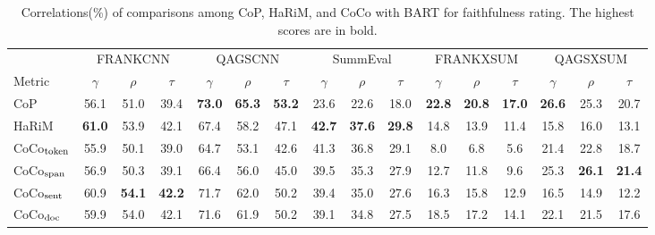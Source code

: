 \begin{table}[t]
	\scriptsize
	\centering
	\begin{tabular}{l|ccc|ccc|ccc|ccc|ccc}
		\toprule[1pt]
		&  \multicolumn{3}{c}{FRANKCNN} & \multicolumn{3}{c}{QAGSCNN} & \multicolumn{3}{c}{SummEval} & \multicolumn{3}{c}{FRANKXSUM} & \multicolumn{3}{c}{QAGSXSUM} \\
		Metric & $\gamma$ &$\rho$ & $\tau$ & $\gamma$ &$\rho$ & $\tau$ & $\gamma$ &$\rho$ & $\tau$ & $\gamma$ &$\rho$ & $\tau$ & $\gamma$ &$\rho$ & $\tau$ \\
		\hline
		CoP & 56.1 & 51.0 & 39.4 & \textbf{73.0} & \textbf{65.3} & \textbf{53.2} & 23.6 & 22.6 & 18.0 & \textbf{22.8} & \textbf{20.8} & \textbf{17.0} & \textbf{26.6} & 25.3 & 20.7 \\
		HaRiM & \textbf{61.0} & 53.9 & 42.1 & 67.4 & 58.2 & 47.1 & \textbf{42.7} & \textbf{37.6} & \textbf{29.8} & 14.8 & 13.9 & 11.4 & 15.8 & 16.0 & 13.1 \\ 
		CoCo$_{\rm token}$ & 55.9 & 50.1 & 39.0 & 64.7 & 53.1 & 42.6 & 41.3 & 36.8 & 29.1 & 8.0 & 6.8 & 5.6 & 21.4 & 22.8 & 18.7 \\
		CoCo$_{\rm span}$ & 56.9 & 50.3 & 39.1 & 66.4 & 56.0 & 45.0 & 39.5 & 35.3 & 27.9 & 12.7 & 11.8 & 9.6 & 25.3 & \textbf{26.1} & \textbf{21.4} \\
		CoCo$_{\rm sent}$ & 60.9 & \textbf{54.1} & \textbf{42.2} & 71.7 & 62.0 & 50.2 & 39.4 & 35.0 & 27.6 & 16.3 & 15.8 & 12.9 & 16.5 & 14.9 & 12.2\\
		CoCo$_{\rm doc}$ & 59.9 & 54.0 & 42.1 & 71.6 & 61.9 & 50.2 & 39.1 & 34.8 & 27.5 & 18.5 & 17.2 & 14.1 & 22.1 & 21.5 & 17.6 \\
		\bottomrule[1pt]
	\end{tabular}
	\caption{Correlations(\%) of comparisons among CoP, HaRiM, and CoCo with BART for faithfulness rating. The highest scores are in bold.} %
	\label{tab:pilot}
\end{table}

